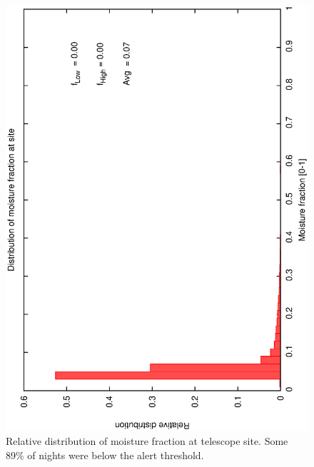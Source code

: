 \begin{figure}[htbp]
\begin{center}
     \includegraphics[scale=0.4, angle=-90]{figures/ecs/moist.dat.eps}
\caption[Relative distribution of moisture fraction at telescope site.]
{Relative distribution of moisture fraction at telescope site. Some 89\% of nights were below the alert threshold.}
\end{center}   
\label{fig:met_moisture_dist}
\end{figure}

